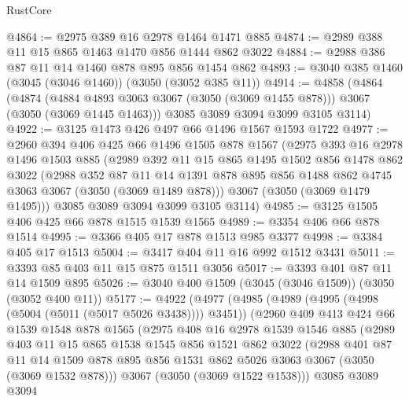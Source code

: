 \begin{lexlean}{RustCore}
\begin{coremodule}
@4864 := @2975 @389 @16 @2978 @1464 @1471 @885
@4874 := @2989 @388 @11 @15 @865 @1463 @1470 @856 @1444 @862 @3022
@4884 := @2988 @386 @87 @11 @14 @1460 @878 @895 @856 @1454 @862
@4893 := @3040 @385 @1460 (@3045 (@3046 @1460)) (@3050 (@3052 @385 @11))
@4914 := @4858
    (@4864
      (@4874 (@4884 @4893 @3063 @3067 (@3050 (@3069 @1455 @878))) @3067 (@3050 (@3069 @1445 @1463)))
      @3085
      @3089
      @3094
      @3099
      @3105
      @3114)
@4922 := @3125 @1473 @426 @497 @66 @1496 @1567 @1593 @1722
@4977 := @2960
    @394
    @406
    @425
    @66
    @1496
    @1505
    @878
    @1567
    (@2975
      @393
      @16
      @2978
      @1496
      @1503
      @885
      (@2989
        @392
        @11
        @15
        @865
        @1495
        @1502
        @856
        @1478
        @862
        @3022
        (@2988
          @352
          @87
          @11
          @14
          @1391
          @878
          @895
          @856
          @1488
          @862
          @4745
          @3063
          @3067
          (@3050 (@3069 @1489 @878)))
        @3067
        (@3050 (@3069 @1479 @1495)))
      @3085
      @3089
      @3094
      @3099
      @3105
      @3114)
@4985 := @3125 @1505 @406 @425 @66 @878 @1515 @1539 @1565
@4989 := @3354 @406 @66 @878 @1514
@4995 := @3366 @405 @17 @878 @1513 @985 @3377
@4998 := @3384 @405 @17 @1513
@5004 := @3417 @404 @11 @16 @992 @1512 @3431
@5011 := @3393 @85 @403 @11 @15 @875 @1511 @3056
@5017 := @3393 @401 @87 @11 @14 @1509 @895
@5026 := @3040 @400 @1509 (@3045 (@3046 @1509)) (@3050 (@3052 @400 @11))
@5177 := @4922
    (@4977
      (@4985
        (@4989 (@4995 (@4998 (@5004 (@5011 (@5017 @5026 @3438)))) @3451))
        (@2960
          @409
          @413
          @424
          @66
          @1539
          @1548
          @878
          @1565
          (@2975
            @408
            @16
            @2978
            @1539
            @1546
            @885
            (@2989
              @403
              @11
              @15
              @865
              @1538
              @1545
              @856
              @1521
              @862
              @3022
              (@2988
                @401
                @87
                @11
                @14
                @1509
                @878
                @895
                @856
                @1531
                @862
                @5026
                @3063
                @3067
                (@3050 (@3069 @1532 @878)))
              @3067
              (@3050 (@3069 @1522 @1538)))
            @3085
            @3089
            @3094

\end{coremodule}
\end{lexlean}
